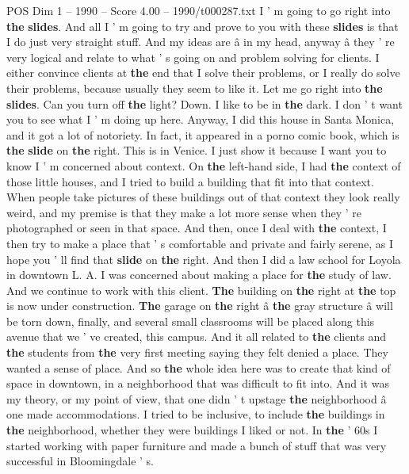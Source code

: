 \begin{textsample}{POS Dim 1 – 1990 – Score 4.00 – 1990/t000287.txt}  \label{ex:f1_pos_075}
I ' m going to go right into \textbf{the} \textbf{slides}.
And all I ' m going to try and prove to you with these \textbf{slides} is that I do just very straight stuff.
And my ideas are â in my head, anyway â they ' re very logical and relate to what ' s going on and problem solving for clients.
I either convince clients at \textbf{the} end that I solve their problems, or I really do solve their problems, because usually they seem to like it.
Let me go right into \textbf{the} \textbf{slides}.
Can you turn off \textbf{the} light?
Down.
I like to be in \textbf{the} dark.
I don ' t want you to see what I ' m doing up here.
Anyway, I did this house in Santa Monica, and it got a lot of notoriety.
In fact, it appeared in a porno comic book, which is \textbf{the} \textbf{slide} on \textbf{the} right.
This is in Venice.
I just show it because I want you to know I ' m concerned about context.
On \textbf{the} left-hand side, I had \textbf{the} context of those little houses, and I tried to build a building that fit into that context.
When people take pictures of these buildings out of that context they look really weird, and my premise is that they make a lot more sense when they ' re photographed or seen in that space.
And then, once I deal with \textbf{the} context, I then try to make a place that ' s comfortable and private and fairly serene, as I hope you ' ll find that \textbf{slide} on \textbf{the} right.
And then I did a law school for Loyola in downtown L.
A.
I was concerned about making a place for \textbf{the} study of law.
And we continue to work with this client. \textbf{The} building on \textbf{the} right at \textbf{the} top is now under construction. \textbf{The} garage on \textbf{the} right â \textbf{the} gray structure â will be torn down, finally, and several small classrooms will be placed along this avenue that we ' ve created, this campus.
And it all related to \textbf{the} clients and \textbf{the} students from \textbf{the} very first meeting saying they felt denied a place.
They wanted a sense of place.
And so \textbf{the} whole idea here was to create that kind of space in downtown, in a neighborhood that was difficult to fit into.
And it was my theory, or my point of view, that one didn ' t upstage \textbf{the} neighborhood â one made accommodations.
I tried to be inclusive, to include \textbf{the} buildings in \textbf{the} neighborhood, whether they were buildings I liked or not.
In \textbf{the} ' 60s I started working with paper furniture and made a bunch of stuff that was very successful in Bloomingdale ' s.

\end{textsample}
